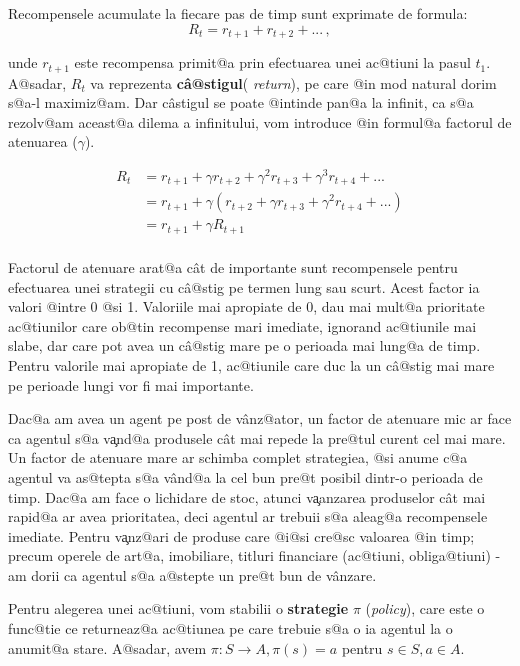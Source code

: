 Recompensele acumulate la fiecare pas de timp sunt exprimate de formula: 
\begin{equation}
	R_t = r_{t+1} + r_{t+2} + ... \,,
\end{equation}


\noindent unde $r_{t+1}$ este recompensa primit@a prin efectuarea unei ac@tiuni la pasul $t_1$. A@sadar, $R_t$ va reprezenta \textbf{c\^ a@stigul}( \textsl{return}), pe care @in mod natural dorim s@a-l maximiz@am. Dar c\^ astigul se poate @intinde pan@a la infinit, ca s@a rezolv@am aceast@a dilema a infinitului, vom introduce @in formul@a factorul de atenuarea ($\gamma$).


\begin{align}
	R_t & =  r_{t+1} + \gamma r_{t+2} + \gamma^{2} r_{t+3} + \gamma^{3} r_{t+4} + ... \\
	& =  r_{t+1} + \gamma \left( r_{t+2} + \gamma r_{t+3} + \gamma^{2} r_{t+4} + ...  \right) \\
	& =  r_{t+1} + \gamma R_{t+1} \\
\end{align}

Factorul de atenuare arat@a c\^ at de importante sunt recompensele pentru efectuarea unei strategii cu c\^ a@stig pe termen lung sau scurt. Acest factor ia valori @intre 0 @si 1. Valoriile mai apropiate de 0, dau mai mult@a prioritate ac@tiunilor care ob@tin recompense mari imediate, ignorand ac@tiunile mai slabe, dar care pot avea un c\^ a@stig mare pe o perioada mai lung@a de timp. Pentru valorile mai apropiate de 1, ac@tiunile care duc la un c\^ a@stig mai mare pe perioade lungi vor fi mai importante.

Dac@a am avea un agent pe post de v\^ anz@ator, un factor de atenuare mic ar face ca agentul s@a v{\c a}nd@a produsele c\^ at mai repede la pre@tul curent cel mai mare. Un factor de atenuare mare ar schimba complet strategiea, @si anume c@a agentul va as@tepta s@a v\^ and@a la cel bun pre@t posibil dintr-o perioada de timp. Dac@a am face o lichidare de stoc, atunci v{\c a}anzarea produselor c\^ at mai rapid@a ar avea prioritatea, deci agentul ar trebuii s@a aleag@a recompensele imediate. Pentru v{\c a}nz@ari de produse care @i@si cre@sc valoarea @in timp; precum operele de art@a, imobiliare, titluri financiare (ac@tiuni, obliga@tiuni) - am dorii ca agentul s@a a@stepte un pre@t bun de v\^ anzare.

Pentru alegerea unei ac@tiuni, vom stabilii o \textbf{strategie} $\pi$ (\textsl{policy}), care este o func@tie ce returneaz@a ac@tiunea pe care trebuie s@a o ia agentul la o anumit@a stare. A@sadar, avem $\pi: S \rightarrow A, \pi(s) = a $ pentru $ s \in S, a \in A$.

